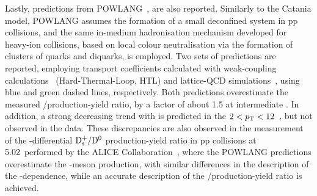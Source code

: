 Lastly, predictions from POWLANG~\cite{Beraudo:2023nlq}, are also reported. Similarly to the Catania model, POWLANG assumes the formation of a small deconfined system in pp collisions, and the same in-medium hadronisation mechanism developed for heavy-ion collisions, based on local colour neutralisation via the formation of clusters of quarks and diquarks, is employed. Two sets of predictions are reported, employing transport coefficients calculated with weak-coupling calculations~\cite{Braaten:1989mz} (Hard-Thermal-Loop, HTL) and lattice-QCD simulations~\cite{Altenkort:2023oms}, using blue and green dashed lines, respectively. Both predictions overestimate the measured \ds/\dpl production-yield ratio, by a factor of about 1.5 at intermediate \pt. In addition, a strong decreasing trend with \pt is predicted in the $2<p_\mathrm{T}<12$~\gevc, but not observed in the data. These discrepancies are also observed in the measurement of the \pt-differential $\mathrm{D_s^+}/\mathrm{D^0}$ production-yield ratio in pp collisions at 5.02~\tev performed by the ALICE Collaboration~\cite{Beraudo:2023nlq}, where the POWLANG predictions overestimate the \ds-meson production, with similar differences in the description of the \pt-dependence, while an accurate description of the \dpl/\dz production-yield ratio is achieved.








